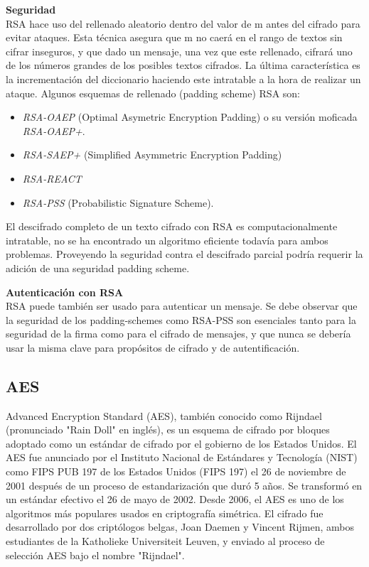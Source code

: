 \documentclass[spanish]{article}
\begin{document}
\textbf{Seguridad}\\
RSA hace uso del rellenado aleatorio dentro del valor de m antes del cifrado para evitar ataques. Esta técnica asegura que m no caerá en el rango de textos sin cifrar inseguros, y que dado un mensaje, una vez que este rellenado, cifrará uno de los números grandes de los posibles textos cifrados. La última característica es la incrementación del diccionario haciendo este intratable a la hora de realizar un ataque.
Algunos esquemas de rellenado (padding scheme) RSA son:
\begin{itemize}
\item \textit{RSA-OAEP} (Optimal Asymetric Encryption Padding) o su versión moficada \textit{RSA-OAEP+}.
\item \textit{RSA-SAEP+} (Simplified Asymmetric Encryption Padding)
\item \textit{RSA-REACT}
\item \textit{RSA-PSS} (Probabilistic Signature Scheme).
\end{itemize}

El descifrado completo de un texto cifrado con RSA es computacionalmente intratable, no se ha encontrado un algoritmo eficiente todavía para ambos problemas. Proveyendo la seguridad contra el descifrado parcial podría requerir la adición de una seguridad padding scheme.

\textbf{Autenticación con RSA}\\
RSA puede también ser usado para autenticar un mensaje. Se debe observar que la seguridad de los padding-schemes como RSA-PSS son esenciales tanto para la seguridad de la firma como para el cifrado de mensajes, y que nunca se debería usar la misma clave para propósitos de cifrado y de autentificación. 


\subsection{AES}
Advanced Encryption Standard (AES), también conocido como Rijndael (pronunciado "Rain Doll" en inglés), es un esquema de cifrado por bloques adoptado como un estándar de cifrado por el gobierno de los Estados Unidos. El AES fue anunciado por el Instituto Nacional de Estándares y Tecnología (NIST) como FIPS PUB 197 de los Estados Unidos (FIPS 197) el 26 de noviembre de 2001 después de un proceso de estandarización que duró 5 años. Se transformó en un estándar efectivo el 26 de mayo de 2002. Desde 2006, el AES es uno de los algoritmos más populares usados en criptografía simétrica.
El cifrado fue desarrollado por dos criptólogos belgas, Joan Daemen y Vincent Rijmen, ambos estudiantes de la Katholieke Universiteit Leuven, y enviado al proceso de selección AES bajo el nombre "Rijndael".\\
\end{document}
